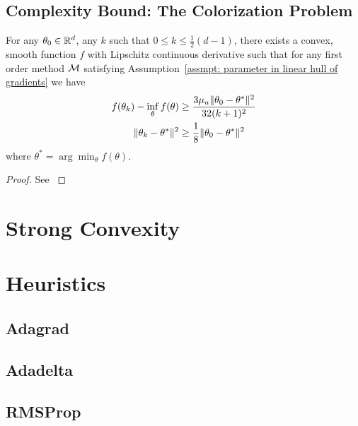 \subsection{Complexity Bound: The Colorization Problem}

\begin{assumption}\label{assmpt: parameter in linear hull of gradients}

\end{assumption}

\begin{theorem}
	For any \(\theta_0\in\mathbb{R}^d\), any \(k\) such that \(0\le k\le \tfrac12 (d-1)\),
	there exists a convex, smooth function \(f\) with Lipschitz continuous
	derivative such that for any first order method \(\mathcal{M}\)
	satisfying Assumption~\ref{assmpt: parameter in linear hull of gradients}
	we have
	\begin{subequations}
	\begin{align}
		f(\theta_k) - \inf_\theta f(\theta)
		&\ge \frac{3\mu_u \|\theta_0 - \theta^*\|^2}{32(k+1)^2} \\
		\|\theta_k -\theta^*\|^2 
		&\ge \frac18 \|\theta_0 - \theta^*\|^2
	\end{align}
	\end{subequations}
	where \(\theta^* = \arg\min_\theta f(\theta)\).
\end{theorem}
\begin{proof}
	See \textcite[Theorem 2.1.7]{nesterovLecturesConvexOptimization2018}
\end{proof}

\section{Strong Convexity}



\section{Heuristics}

\subsection{Adagrad}

\subsection{Adadelta}

\subsection{RMSProp}


\endinput